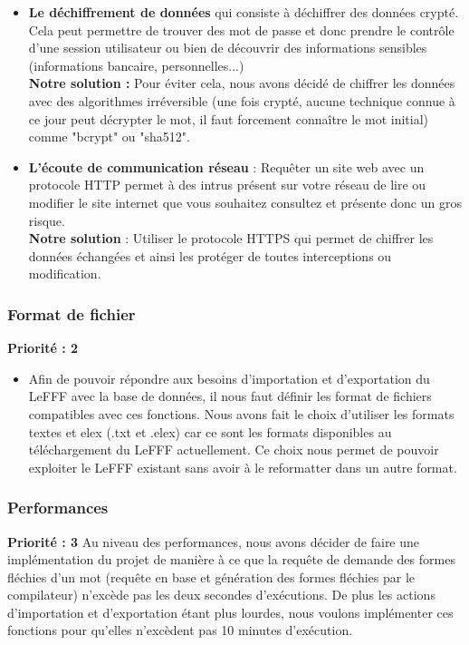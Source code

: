 \documentclass[12pt,a4paper]{article}
\begin{document}
\begin{itemize}
    \item \textbf{Le déchiffrement de données} qui consiste à déchiffrer des données crypté. Cela peut permettre de trouver des mot de passe et donc prendre le contrôle d'une session utilisateur ou bien de découvrir des informations sensibles (informations bancaire, personnelles...) \\
    \textbf{Notre solution :} Pour éviter cela, nous avons décidé de chiffrer les données avec des algorithmes irréversible (une fois crypté, aucune technique connue à ce jour peut décrypter le mot, il faut forcement connaître le mot initial) comme "bcrypt" ou "sha512".
    
    \item \textbf{L'écoute de communication réseau} : Requêter un site web avec un protocole HTTP permet à des intrus présent sur votre réseau de lire ou modifier le site internet que vous souhaitez consultez et présente donc un gros risque. \\
    \textbf{Notre solution} : Utiliser le protocole HTTPS qui permet de chiffrer les données échangées et ainsi les protéger de toutes interceptions ou modification.
\end{itemize}

\subsubsection{Format de fichier}
\textbf{Priorité : 2}
\smallbreak
\begin{itemize}
\item Afin de pouvoir répondre aux besoins d'importation et d'exportation du LeFFF avec la base de données, il nous faut définir les format de fichiers compatibles avec ces fonctions.
Nous avons fait le choix d'utiliser les formats textes et elex (.txt et .elex)  car ce sont les formats disponibles au téléchargement du LeFFF actuellement. Ce choix nous permet de pouvoir exploiter le LeFFF existant sans avoir à le reformatter dans un autre format.
\end{itemize}

\subsubsection{Performances}
\textbf{Priorité : 3}
\smallbreak
Au niveau des performances, nous avons décider de faire une implémentation du projet de manière à ce que la requête de demande des formes fléchies d'un mot (requête en base et génération des formes fléchies par le compilateur) n'excède pas les deux secondes d'exécutions. De plus les actions d'importation et d'exportation étant plus lourdes, nous voulons implémenter ces fonctions pour qu'elles n'excèdent pas 10 minutes d'exécution.
\end{document}
